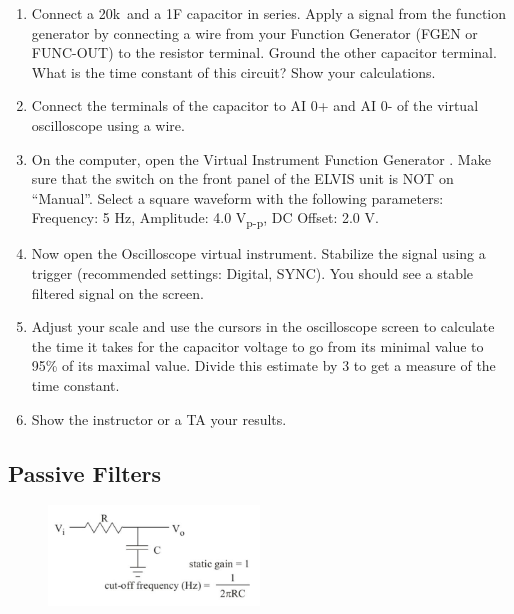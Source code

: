 \documentclass{article}
\begin{document}
\begin{enumerate}
	\item Connect a 20k\textOmega\ and a 1\textmu F capacitor in series. Apply a signal from the function generator by connecting a wire from your Function Generator (FGEN or FUNC-OUT) to the resistor terminal. Ground the other capacitor terminal. What is the time constant of this circuit? Show your calculations.
	\item Connect the terminals of the capacitor to AI 0+ and AI 0- of the virtual oscilloscope using a wire.
	\item On the computer, open the Virtual Instrument Function Generator . Make sure that the switch on the front panel of the ELVIS unit is NOT on “Manual”. Select a square waveform with the following parameters: Frequency: 5 Hz, Amplitude: 4.0 V\textsubscript{p-p}, DC Offset: 2.0 V.
	\item Now open the Oscilloscope virtual instrument. Stabilize the signal using a trigger (recommended settings: Digital, SYNC). You should see a stable filtered signal on the screen.
	\item Adjust your scale and use the cursors in the oscilloscope screen to calculate the time it takes for the capacitor voltage to go from its minimal value to 95\% of its maximal value. Divide this estimate by 3 to get a measure of the time constant.
	\item Show the instructor or a TA your results.
\end{enumerate}

\subsection*{Passive Filters}
\begin{figure}[h]
    	\includegraphics[width=0.5\textwidth]{lab_1_fig_3.jpg}
    	\centering
		\end{figure}
		
\end{document}
